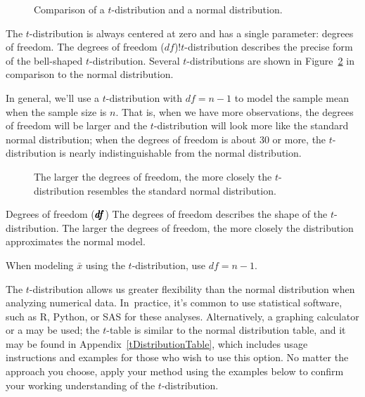 \begin{figure}[h]
  \centering
  \caption{Comparison of a $t$-distribution
      and a normal distribution.}
  \label{tDistCompareToNormalDist}
\end{figure}

The $t$-distribution is always centered at zero and
has a single parameter: degrees of freedom.
The 
    {degrees of freedom ($df$)!$t$-distribution}
describes the precise form of the bell-shaped $t$-distribution.
Several $t$-distributions are shown in
Figure~\ref{tDistConvergeToNormalDist}
in comparison to the normal distribution.

In general, we'll use a $t$-distribution
with $df = n - 1$ to model the sample mean
when the sample size is $n$.
That is, when we have more observations,
the degrees of freedom will be larger and
the $t$-distribution will look more like the
standard normal distribution;
when the degrees of freedom is about 30 or more,
the $t$-distribution is nearly indistinguishable
from the normal distribution.

\begin{figure}[h]
  \centering
  \caption{The larger the degrees of freedom, the more
      closely the $t$-distribution resembles the standard
      normal distribution.}
  \label{tDistConvergeToNormalDist}
\end{figure}

\begin{onebox}{Degrees of freedom
    ($\pmb{\MakeLowercase{df}}$)}
  The degrees of freedom describes the shape of the
  $t$-distribution.
  The larger the degrees of freedom, the more closely
  the distribution approximates the normal model. \stdvspace{}

  When modeling $\bar{x}$ using the $t$-distribution,
  use $df = n - 1$.
\end{onebox}


The $t$-distribution allows us greater flexibility than
the normal distribution when analyzing numerical data.
In~practice, it's common to use statistical software,
such as R, Python, or SAS for these analyses.
Alternatively, a graphing calculator or a
 may be used;
the $t$-table is similar to the normal distribution table,
and it may be found in Appendix~\ref{tDistributionTable},
which includes usage instructions and examples
for those who wish to use this option.
No matter the approach you choose, apply your method
using the examples below to confirm your working
understanding of the $t$-distribution.


